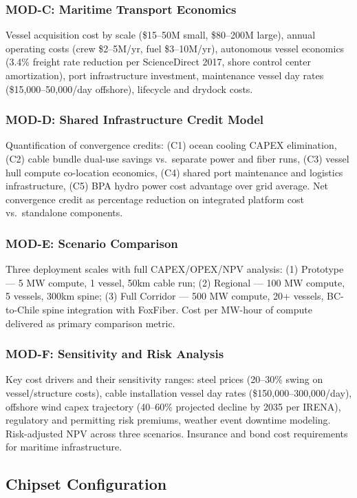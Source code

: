 \documentclass[11pt,letterpaper]{article}
\begin{document}
\subsubsection{MOD-C: Maritime Transport Economics}
Vessel acquisition cost by scale (\$15--50M small, \$80--200M large), annual operating costs
(crew \$2--5M/yr, fuel \$3--10M/yr), autonomous vessel economics (3.4\% freight rate reduction
per ScienceDirect 2017, shore control center amortization), port infrastructure investment,
maintenance vessel day rates (\$15,000--50,000/day offshore), lifecycle and drydock costs.

\subsubsection{MOD-D: Shared Infrastructure Credit Model}
Quantification of convergence credits: (C1) ocean cooling CAPEX elimination, (C2) cable
bundle dual-use savings vs.\ separate power and fiber runs, (C3) vessel hull compute
co-location economics, (C4) shared port maintenance and logistics infrastructure,
(C5) BPA hydro power cost advantage over grid average. Net convergence credit as
percentage reduction on integrated platform cost vs.\ standalone components.

\subsubsection{MOD-E: Scenario Comparison}
Three deployment scales with full CAPEX/OPEX/NPV analysis: (1) Prototype --- 5 MW compute,
1 vessel, 50km cable run; (2) Regional --- 100 MW compute, 5 vessels, 300km spine;
(3) Full Corridor --- 500 MW compute, 20+ vessels, BC-to-Chile spine integration
with FoxFiber. Cost per MW-hour of compute delivered as primary comparison metric.

\subsubsection{MOD-F: Sensitivity and Risk Analysis}
Key cost drivers and their sensitivity ranges: steel prices (20--30\% swing on vessel/structure
costs), cable installation vessel day rates (\$150,000--300,000/day), offshore wind capex
trajectory (40--60\% projected decline by 2035 per IRENA), regulatory and permitting risk
premiums, weather event downtime modeling. Risk-adjusted NPV across three scenarios.
Insurance and bond cost requirements for maritime infrastructure.

\subsection{Chipset Configuration}
\end{document}
